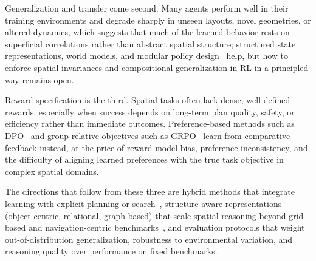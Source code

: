 Generalization and transfer come second.
Many agents perform well in their training environments and degrade sharply in unseen layouts, novel geometries, or altered dynamics, which suggests that much of the learned behavior rests on superficial correlations rather than abstract spatial structure; structured state representations, world models, and modular policy design~\cite{chaplot2018active,gupta2017cognitivemapping} help, but how to enforce spatial invariances and compositional generalization in RL in a principled way remains open.

Reward specification is the third.
Spatial tasks often lack dense, well-defined rewards, especially when success depends on long-term plan quality, safety, or efficiency rather than immediate outcomes.
Preference-based methods such as DPO~\cite{rafailov2023directpo} and group-relative objectives such as GRPO~\cite{guo2025deepseekr1} learn from comparative feedback instead, at the price of reward-model bias, preference inconsistency, and the difficulty of aligning learned preferences with the true task objective in complex spatial domains.

The directions that follow from these three are hybrid methods that integrate learning with explicit planning or search~\cite{tamar2016valueiterationnetworks,karkus2017qmdpnet}, structure-aware representations (object-centric, relational, graph-based) that scale spatial reasoning beyond grid-based and navigation-centric benchmarks~\cite{zambaldi2019relationaldeep}, and evaluation protocols that weight out-of-distribution generalization, robustness to environmental variation, and reasoning quality over performance on fixed benchmarks.

